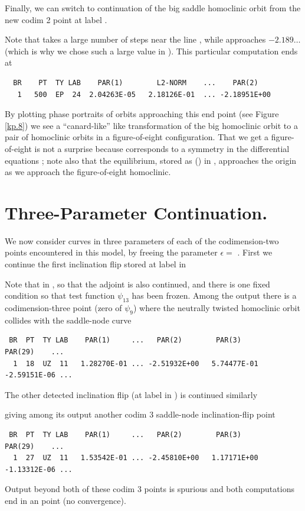 \documentclass[12pt]{report}
\def\eps{\epsilon}
\begin{document}
Finally, we can switch to continuation of the big saddle homoclinic orbit 
from the new codim 2 point at label . 
\begin{center}
\end{center}
Note that \AUTO takes a large number of steps near the line  
, while  approaches $-2.189\ldots$  
(which is why we chose such a large value  in ). This
particular computation ends at 
\begin{verbatim}  
  BR    PT  TY LAB    PAR(1)        L2-NORM    ...    PAR(2)   
   1   500  EP  24  2.04263E-05   2.18126E-01  ... -2.18951E+00
\end{verbatim}
By plotting phase portraits of orbits approaching this end point (see Figure
\ref{kp.8}) we see a ``canard-like'' like transformation of the big homoclinic
orbit to a pair of homoclinic orbits in a figure-of-eight configuration.
That we get a figure-of-eight is not a surprise because 
corresponds to a symmetry in the differential equations \cite{Ko:94};
note also that the equilibrium, stored as () in
, approaches the origin as we approach the figure-of-eight homoclinic.

\section{Three-Parameter Continuation.}
We now consider curves in three parameters of each of
the codimension-two points encountered in this model, by
freeing the parameter $\eps=$ .
First we continue the first inclination flip stored at label
 in 
\begin{center}
\end{center}
Note that  in , so that the adjoint is also
continued, and there is one fixed condition  so that
test function $\psi_{13}$ has been frozen.
Among the output there is a codimension-three point (zero of $\psi_9$)
where the neutrally twisted homoclinic orbit collides with the saddle-node
curve
\begin{verbatim}
 BR  PT  TY LAB    PAR(1)     ...   PAR(2)        PAR(3)        PAR(29)    ...
  1  18  UZ  11   1.28270E-01 ... -2.51932E+00   5.74477E-01  -2.59151E-06 ...
\end{verbatim}
The other detected inclination flip (at label  in ) is continued
similarly
\begin{center}
\end{center}
giving among its output another codim 3 saddle-node inclination-flip point
\begin{verbatim} 
 BR  PT  TY LAB    PAR(1)     ...   PAR(2)        PAR(3)        PAR(29)    ...  
  1  27  UZ  11   1.53542E-01 ... -2.45810E+00   1.17171E+00  -1.13312E-06 ...
\end{verbatim}
Output beyond both of these codim 3 points is spurious and both computations end in
an  point (no convergence).
\end{document}
